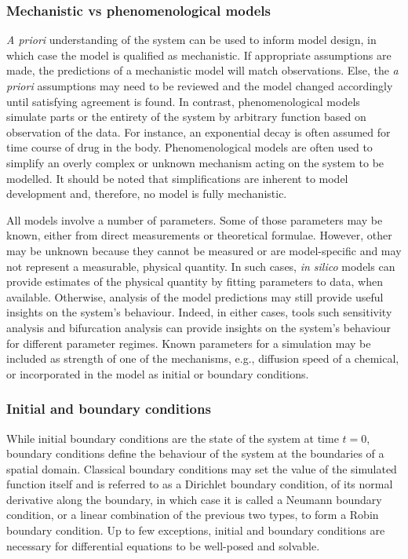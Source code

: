 \documentclass[12pt,a4paper]{article}
\begin{document}
\subsubsection*{Mechanistic vs phenomenological models}
\textit{A priori} understanding of the system can be used to inform model design, in which case the model is qualified as mechanistic.
If appropriate assumptions are made, the predictions of a mechanistic model will match observations.
Else, the \textit{a priori} assumptions may need to be reviewed and the model changed accordingly until satisfying agreement is found.
In contrast, phenomenological models simulate parts or the entirety of the system by arbitrary function based on observation of the data.
For instance, an exponential decay is often assumed for time course of drug in the body.
Phenomenological models are often used to simplify an overly complex or unknown mechanism acting on the system to be modelled.
It should be noted that simplifications are inherent to model development and, therefore, no model is fully mechanistic.

All models involve a number of parameters.
Some of those parameters may be known, either from direct measurements or theoretical formulae.
However, other may be unknown because they cannot be measured or are model-specific and may not represent a measurable, physical quantity.
In such cases, \textit{in silico} models can provide estimates of the physical quantity by fitting parameters to data, when available.
Otherwise, analysis of the model predictions may still provide useful insights on the system's behaviour.
Indeed, in either cases, tools such sensitivity analysis and bifurcation analysis can provide insights on the system's behaviour for different parameter regimes.
Known parameters for a simulation may be included as strength of one of the mechanisms, e.g., diffusion speed of a chemical, or incorporated in the model as initial or boundary conditions.

\subsubsection*{Initial and boundary conditions}
While initial boundary conditions are the state of the system at time $t=0$, boundary conditions define the behaviour of the system at the boundaries of a spatial domain.
Classical boundary conditions may set the value of the simulated function itself and is referred to as a Dirichlet boundary condition, of its normal derivative along the boundary, in which case it is called a Neumann boundary condition, or a linear combination of the previous two types, to form a Robin boundary condition.
Up to few exceptions, initial and boundary conditions are necessary for differential equations to be well-posed and solvable.
\end{document}
